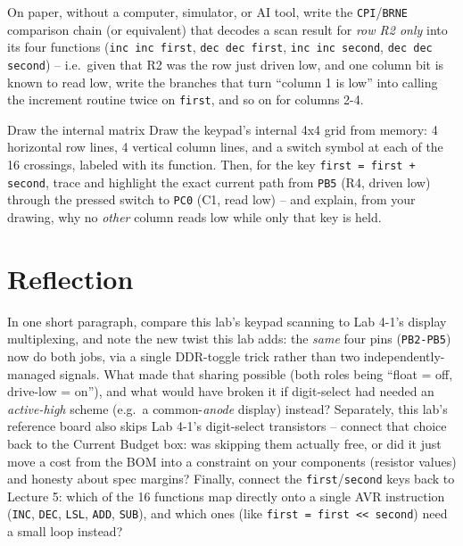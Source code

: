 \documentclass[11pt]{article}
\begin{document}
\begin{writecode}
On paper, without a computer, simulator, or AI tool, write the \texttt{CPI}/\texttt{BRNE}
comparison chain (or equivalent) that decodes a scan result for \emph{row R2 only}
into its four functions (\texttt{inc inc first}, \texttt{dec dec first}, \texttt{inc
inc second}, \texttt{dec dec second}) -- i.e.\ given that R2 was the row just
driven low, and one column bit is known to read low, write the branches that turn
``column 1 is low'' into calling the increment routine twice on \texttt{first},
and so on for columns 2-4.
\end{writecode}

\begin{drawex}{Draw the internal matrix}
Draw the keypad's internal 4x4 grid from memory: 4 horizontal row lines, 4
vertical column lines, and a switch symbol at each of the 16 crossings, labeled
with its function. Then, for the key \texttt{first = first + second}, trace and
highlight the exact current path from \texttt{PB5} (R4, driven low) through the
pressed switch to \texttt{PC0} (C1, read low) -- and explain, from your drawing,
why no \emph{other} column reads low while only that key is held.
\end{drawex}

\section*{Reflection}

In one short paragraph, compare this lab's keypad scanning to Lab 4-1's display
multiplexing, and note the new twist this lab adds: the \emph{same} four pins
(\texttt{PB2-PB5}) now do both jobs, via a single DDR-toggle trick rather than
two independently-managed signals. What made that sharing possible (both roles
being ``float = off, drive-low = on''), and what would have broken it if
digit-select had needed an \emph{active-high} scheme (e.g.\ a common-\emph{anode}
display) instead? Separately, this lab's reference board also skips Lab 4-1's
digit-select transistors -- connect that choice back to the Current Budget box:
was skipping them actually free, or did it just move a cost from the BOM into a
constraint on your components (resistor values) and honesty about spec margins?
Finally, connect the \texttt{first}/\texttt{second} keys back to Lecture 5: which
of the 16 functions map directly onto a single AVR instruction (\texttt{INC},
\texttt{DEC}, \texttt{LSL}, \texttt{ADD}, \texttt{SUB}), and which ones (like
\texttt{first = first << second}) need a small loop instead?
\end{document}
